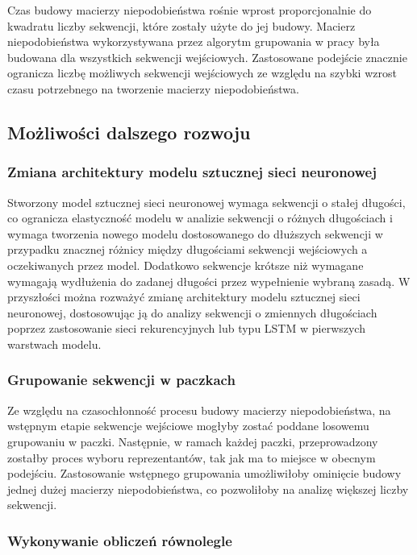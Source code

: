             Czas budowy macierzy niepodobieństwa rośnie wprost proporcjonalnie do kwadratu liczby sekwencji, które zostały użyte do jej budowy. Macierz niepodobieństwa wykorzystywana przez algorytm grupowania w pracy była budowana dla wszystkich sekwencji wejściowych. Zastosowane podejście znacznie ogranicza liczbę możliwych sekwencji wejściowych ze względu na szybki wzrost czasu potrzebnego na tworzenie macierzy niepodobieństwa.

    \subsection{Możliwości dalszego rozwoju}

        \subsubsection{Zmiana architektury modelu sztucznej sieci neuronowej}

            Stworzony model sztucznej sieci neuronowej wymaga sekwencji o stałej długości, co ogranicza elastyczność modelu w analizie sekwencji o różnych długościach i wymaga tworzenia nowego modelu dostosowanego do dłuższych sekwencji w przypadku znacznej różnicy między długościami sekwencji wejściowych a oczekiwanych przez model. Dodatkowo sekwencje krótsze niż wymagane wymagają wydłużenia do zadanej długości przez wypełnienie wybraną zasadą. W przyszłości można rozważyć zmianę architektury modelu sztucznej sieci neuronowej, dostosowując ją do analizy sekwencji o zmiennych długościach poprzez zastosowanie sieci rekurencyjnych lub typu LSTM w pierwszych warstwach modelu.

        \subsubsection{Grupowanie sekwencji w paczkach}

            Ze względu na czasochłonność procesu budowy macierzy niepodobieństwa, na wstępnym etapie sekwencje wejściowe mogłyby zostać poddane losowemu grupowaniu w paczki. Następnie, w ramach każdej paczki, przeprowadzony zostałby proces wyboru reprezentantów, tak jak ma to miejsce w obecnym podejściu. Zastosowanie wstępnego grupowania umożliwiłoby ominięcie budowy jednej dużej macierzy niepodobieństwa, co pozwoliłoby na analizę większej liczby sekwencji.

        \subsubsection{Wykonywanie obliczeń równolegle}

